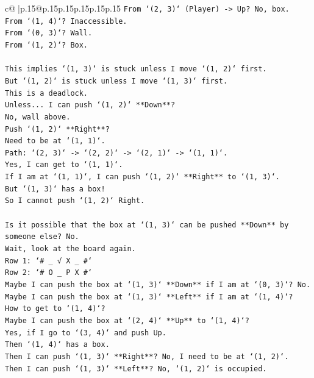 \documentclass{article}
\begin{document}
{\begin{supertabular}{c@{$\;$}|p{.15\linewidth}@{}p{.15\linewidth}p{.15\linewidth}p{.15\linewidth}p{.15\linewidth}p{.15\linewidth}}
{{{\texttt{From `(2, 3)` (Player) {-}> Up? No, box.} \\
\texttt{From `(1, 4)`? Inaccessible.} \\
\texttt{From `(0, 3)`? Wall.} \\
\texttt{From `(1, 2)`? Box.} \\
\\ 
\texttt{This implies `(1, 3)` is stuck unless I move `(1, 2)` first.} \\
\texttt{But `(1, 2)` is stuck unless I move `(1, 3)` first.} \\
\texttt{This is a deadlock.} \\
\texttt{Unless... I can push `(1, 2)` **Down**?} \\
\texttt{No, wall above.} \\
\texttt{Push `(1, 2)` **Right**?} \\
\texttt{Need to be at `(1, 1)`.} \\
\texttt{Path: `(2, 3)` {-}> `(2, 2)` {-}> `(2, 1)` {-}> `(1, 1)`.} \\
\texttt{Yes, I can get to `(1, 1)`.} \\
\texttt{If I am at `(1, 1)`, I can push `(1, 2)` **Right** to `(1, 3)`.} \\
\texttt{But `(1, 3)` has a box!} \\
\texttt{So I cannot push `(1, 2)` Right.} \\
\\ 
\texttt{Is it possible that the box at `(1, 3)` can be pushed **Down** by someone else? No.} \\
\texttt{Wait, look at the board again.} \\
\texttt{Row 1: `\# \_ √ X \_ \#`} \\
\texttt{Row 2: `\# O \_ P X \#`} \\
\texttt{Maybe I can push the box at `(1, 3)` **Down** if I am at `(0, 3)`? No.} \\
\texttt{Maybe I can push the box at `(1, 3)` **Left** if I am at `(1, 4)`?} \\
\texttt{How to get to `(1, 4)`?} \\
\texttt{Maybe I can push the box at `(2, 4)` **Up** to `(1, 4)`?} \\
\texttt{Yes, if I go to `(3, 4)` and push Up.} \\
\texttt{Then `(1, 4)` has a box.} \\
\texttt{Then I can push `(1, 3)` **Right**? No, I need to be at `(1, 2)`.} \\
\texttt{Then I can push `(1, 3)` **Left**? No, `(1, 2)` is occupied.} \\
}}}
\end{supertabular}}
\end{document}
